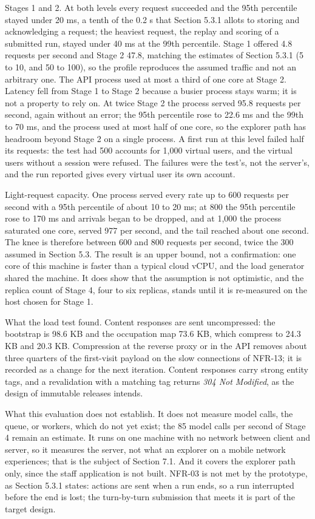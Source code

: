 Stages 1 and 2. At both levels every request succeeded and the 95th percentile stayed under 20 ms, a tenth of the 0.2 s that Section 5.3.1 allots to storing and acknowledging a request; the heaviest request, the replay and scoring of a submitted run, stayed under 40 ms at the 99th percentile. Stage 1 offered 4.8 requests per second and Stage 2 47.8, matching the estimates of Section 5.3.1 (5 to 10, and 50 to 100), so the profile reproduces the assumed traffic and not an arbitrary one. The API process used at most a third of one core at Stage 2. Latency fell from Stage 1 to Stage 2 because a busier process stays warm; it is not a property to rely on. At twice Stage 2 the process served 95.8 requests per second, again without an error; the 95th percentile rose to 22.6 ms and the 99th to 70 ms, and the process used at most half of one core, so the explorer path has headroom beyond Stage 2 on a single process. A first run at this level failed half its requests: the test had 500 accounts for 1,000 virtual users, and the virtual users without a session were refused. The failures were the test's, not the server's, and the run reported gives every virtual user its own account.

Light-\allowbreak{}request capacity. One process served every rate up to 600 requests per second with a 95th percentile of about 10 to 20 ms; at 800 the 95th percentile rose to 170 ms and arrivals began to be dropped, and at 1,000 the process saturated one core, served 977 per second, and the tail reached about one second. The knee is therefore between 600 and 800 requests per second, twice the 300 assumed in Section 5.3. The result is an upper bound, not a confirmation: one core of this machine is faster than a typical cloud vCPU, and the load generator shared the machine. It does show that the assumption is not optimistic, and the replica count of Stage 4, four to six replicas, stands until it is re-measured on the host chosen for Stage 1.

What the load test found. Content responses are sent uncompressed: the bootstrap is 98.6 KB and the occupation map 73.6 KB, which compress to 24.3 KB and 20.3 KB. Compression at the reverse proxy or in the API removes about three quarters of the first-visit payload on the slow connections of NFR-13; it is recorded as a change for the next iteration. Content responses carry strong entity tags, and a revalidation with a matching tag returns \textit{304 Not Modified}, as the design of immutable releases intends.

What this evaluation does not establish. It does not measure model calls, the queue, or workers, which do not yet exist; the 85 model calls per second of Stage 4 remain an estimate. It runs on one machine with no network between client and server, so it measures the server, not what an explorer on a mobile network experiences; that is the subject of Section 7.1. And it covers the explorer path only, since the staff application is not built. NFR-03 is not met by the prototype, as Section 5.3.1 states: actions are sent when a run ends, so a run interrupted before the end is lost; the turn-\allowbreak{}by-\allowbreak{}turn submission that meets it is part of the target design.

